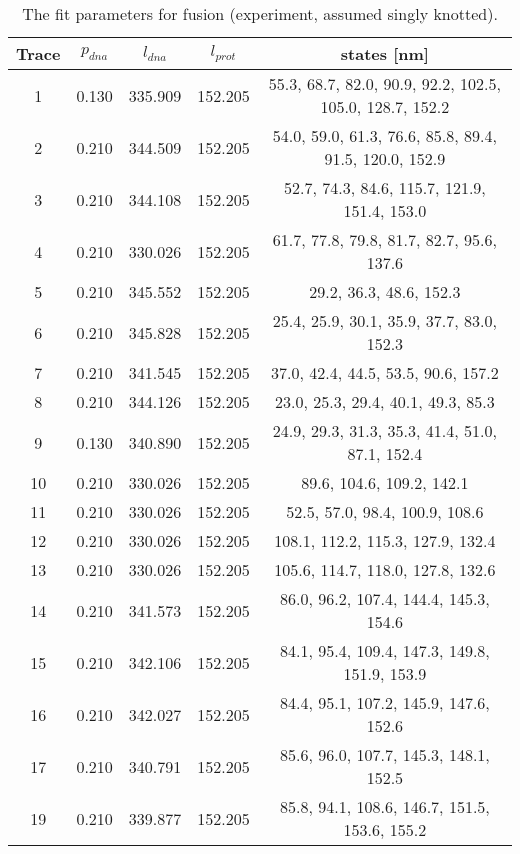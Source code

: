 \begin{table}
    \tiny
    \centering
    \caption{The fit parameters for fusion (experiment, assumed singly knotted).}
    \label{tab:fusion-fit-parameters-pexp-unknotted}
    \begin{tabular}{c|c|c|c|c}
        \textbf{Trace} & $p_{dna}$ & $l_{dna}$ & $l_{prot}$ & states [nm]\\\hline
        1 & 0.130 & 335.909 & 152.205 & 55.3, 68.7, 82.0, 90.9, 92.2, 102.5, 105.0, 128.7, 152.2\\
        2 & 0.210 & 344.509 & 152.205 & 54.0, 59.0, 61.3, 76.6, 85.8, 89.4, 91.5, 120.0, 152.9\\
        3 & 0.210 & 344.108 & 152.205 & 52.7, 74.3, 84.6, 115.7, 121.9, 151.4, 153.0\\
        4 & 0.210 & 330.026 & 152.205 & 61.7, 77.8, 79.8, 81.7, 82.7, 95.6, 137.6\\
        5 & 0.210 & 345.552 & 152.205 & 29.2, 36.3, 48.6, 152.3\\
        6 & 0.210 & 345.828 & 152.205 & 25.4, 25.9, 30.1, 35.9, 37.7, 83.0, 152.3\\
        7 & 0.210 & 341.545 & 152.205 & 37.0, 42.4, 44.5, 53.5, 90.6, 157.2\\
        8 & 0.210 & 344.126 & 152.205 & 23.0, 25.3, 29.4, 40.1, 49.3, 85.3\\
        9 & 0.130 & 340.890 & 152.205 & 24.9, 29.3, 31.3, 35.3, 41.4, 51.0, 87.1, 152.4\\
        10 & 0.210 & 330.026 & 152.205 & 89.6, 104.6, 109.2, 142.1\\
        11 & 0.210 & 330.026 & 152.205 & 52.5, 57.0, 98.4, 100.9, 108.6\\
        12 & 0.210 & 330.026 & 152.205 & 108.1, 112.2, 115.3, 127.9, 132.4\\
        13 & 0.210 & 330.026 & 152.205 & 105.6, 114.7, 118.0, 127.8, 132.6\\
        14 & 0.210 & 341.573 & 152.205 & 86.0, 96.2, 107.4, 144.4, 145.3, 154.6\\
        15 & 0.210 & 342.106 & 152.205 & 84.1, 95.4, 109.4, 147.3, 149.8, 151.9, 153.9\\
        16 & 0.210 & 342.027 & 152.205 & 84.4, 95.1, 107.2, 145.9, 147.6, 152.6\\
        17 & 0.210 & 340.791 & 152.205 & 85.6, 96.0, 107.7, 145.3, 148.1, 152.5\\
        19 & 0.210 & 339.877 & 152.205 & 85.8, 94.1, 108.6, 146.7, 151.5, 153.6, 155.2\\
    \end{tabular}
\end{table}

